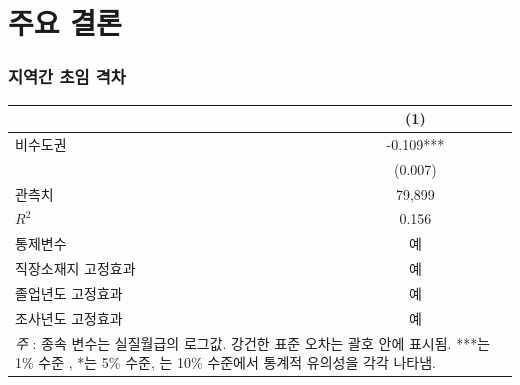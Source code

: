 \documentclass[aspectratio=169,xcolor=dvipsnames,handout]{beamer}
\begin{document}
\section{주요 결론}%
\begin{frame}
    \frametitle{지역간 초임 격차}
    \begin{table}[ht]
        \centering
        \tiny
        \begin{tabular}{lc}
        \toprule
        & \textbf{(1)} \\
        \midrule
        비수도권                    & -0.109***    \\
                                     & (0.007)      \\
        \midrule
        관측치                 & 79,899       \\
        $R^2$                    & 0.156        \\
        통제변수                     & 예          \\
        직장소재지 고정효과 & 예          \\
        졸업년도 고정효과 & 예          \\
        조사년도 고정효과 & 예          \\
        \bottomrule
        \multicolumn{2}{p{6cm}}{\tiny\textit{주} : 종속 변수는 실질월급의 로그값. 강건한 표준 오차는 괄호 안에 표시됨. ***는 1\% 수준 , *는 5\% 수준, 는 10\% 수준에서 통계적 유의성을 각각 나타냄.} \\
        \end{tabular}
    \end{table}
\end{frame}
\end{document}
